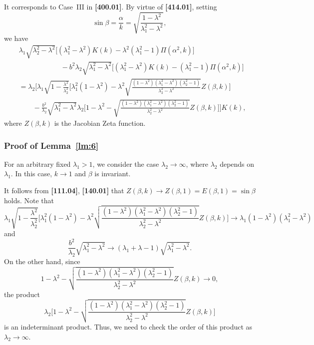 \documentclass[11pt]{amsart}
\numberwithin{equation}{section}
\numberwithin{figure}{section}
\theoremstyle{plain} %
\theoremstyle{definition} %
\begin{document}
It corresponds to Case~{III} in \textbf{[400.01]}. By virtue of \textbf{[414.01]}, setting 
\[
\sin \beta = \frac{\alpha}{k} = \sqrt{\frac{1-\lambda^2}{\lambda_1^2-\lambda^2}}, 
\]
we have 
\begin{align}
\nonumber &\lambda_1\sqrt{\lambda_2^2-\lambda^2} \bigg[(\lambda_1^2-\lambda^2) K(k) - \lambda^2 (\lambda_1^2-1) \Pi (\alpha^2,k) \bigg] \\
\nonumber &\qquad \qquad \qquad - b^2 \lambda_2\sqrt{\lambda_1^2-\lambda^2} \bigg[(\lambda_1^2-\lambda^2) K(k) - (\lambda_1^2-1) \Pi (\alpha^2,k) \bigg] \\
\nonumber & = \lambda_2\bigg[\lambda_1\sqrt{1-\frac{\lambda^2}{\lambda_2^2}} \bigg[\lambda_1^2 (1-\lambda^2)  -\lambda^2\sqrt{ \frac{(1-\lambda^2)(\lambda_1^2-\lambda^2)(\lambda_2^2-1)}{\lambda_2^2-\lambda^2}} Z(\beta,k) \bigg] \\
& \qquad -\frac{b^2}{\lambda_2}\sqrt{\lambda_1^2-\lambda^2} \lambda_2 \bigg[1-\lambda^2  -\sqrt{ \frac{(1-\lambda^2)(\lambda_1^2-\lambda^2)(\lambda_2^2-1)}{\lambda_2^2-\lambda^2}} Z(\beta,k) \bigg] \bigg] K(k), 
\label{Jacobi_Zeta_estimate}
\end{align}
where $Z(\beta,k)$ is the Jacobian Zeta function. 

\subsubsection{Proof of Lemma~\ref{lm:6}} %

For an arbitrary fixed $\lambda_1>1$, we consider the case $\lambda_2\to \infty$, where $\lambda_2$ depends on $\lambda_1$. In this case, $k\to 1$ and $\beta$ is invariant. 

It follows from \textbf{[111.04]}, \textbf{[140.01]} that $Z (\beta,k) \to Z(\beta,1)=E(\beta,1)=\sin\beta$ holds. 
Note that 
\[
\lambda_1\sqrt{1-\frac{\lambda^2}{\lambda_2^2}}\bigg[\lambda_1^2 (1-\lambda^2)  -\lambda^2\sqrt{ \frac{(1-\lambda^2)(\lambda_1^2-\lambda^2)(\lambda_2^2-1)}{\lambda_2^2-\lambda^2}} Z(\beta,k)\bigg] \to \lambda_1(1-\lambda^2) (\lambda_1^2-\lambda^2)
\]
and
\[
\frac{b^2}{\lambda_2}\sqrt{\lambda_1^2-\lambda^2}\to (\lambda_1+\lambda-1)\sqrt{\lambda_1^2-\lambda^2}.
\]
On the other hand, since 
\[
1-\lambda^2  -\sqrt{ \frac{(1-\lambda^2)(\lambda_1^2-\lambda^2)(\lambda_2^2-1)}{\lambda_2^2-\lambda^2}} Z(\beta,k) \to 0, 
\]
the product
\[
\lambda_2 \bigg[1-\lambda^2  -\sqrt{ \frac{(1-\lambda^2)(\lambda_1^2-\lambda^2)(\lambda_2^2-1)}{\lambda_2^2-\lambda^2}} Z(\beta,k) \bigg]
\]
is an indeterminant product.  Thus, we need to check the order of this product as $\lambda_2\to \infty$. 
\end{document}

